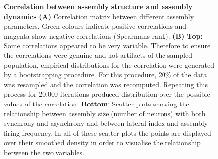 \begin{figure}[!ht]
            \caption[\label{fig:R1_F6} \textbf{Correlation between assembly structure and assembly dynamics}]{\label{fig:R1_F6}\textbf{Correlation between assembly structure and assembly dynamics} \textbf{(A)} Correlation matrix between different assembly parameters. Green colours indicate positive correlations and magenta show negative correlations (Spearmans rank).  \textbf{(B) Top:} Some correlations appeared to be very variable. Therefore to ensure the correlations were genuine and not artifacts of the sampled population, empirical distributions for the correlation were generated by a bootstrapping procedure. For this procedure, 20\% of the data was resampled and the correlation was recomputed. Repeating this process for 20,000 iterations produced  distribution over the possible values of the correlation. \textbf{Bottom:} Scatter plots showing the relationship between assembly size (number of neurons) with both synchrony and asynchrony and between lateral index and assembly firing frequency. In all of these scatter plots the points are displayed over their smoothed density in order to visualise the relationship between the two variables.
            }
      \end{figure}

